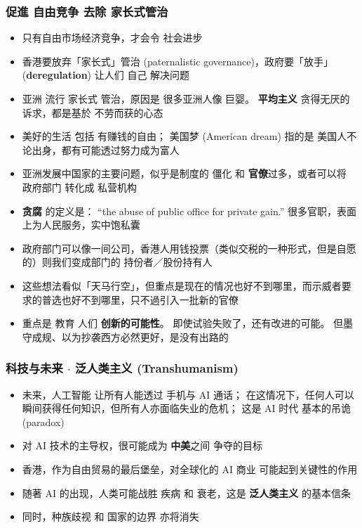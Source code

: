 \documentclass[10pt]{beamer}
\newcommand{\emp}[1]{{\color{blue}\textbf{#1}}}
\newif\ifframeinlbf
\begin{document}
\begin{frame}
\frametitle{促進 自由竞争 \textbullet 去除 家长式管治}
\begin{itemize}
	\item 只有自由市场经济竞争，才会令 社会进步
	
	\item 香港要放弃「家长式」管治 (paternalistic governance)，政府要「放手」(\emp{deregulation}) 让人们 自己 解决问题
	
	\item 亚洲 流行 家长式 管治，原因是 很多亚洲人像 巨婴。 \emp{平均主义} 贪得无厌的诉求，都是基於 不劳而获的心态
	
	\item 美好的生活 包括 有赚钱的自由； 美国梦 (American dream) 指的是 美国人不论出身，都有可能透过努力成为富人
	
	\item 亚洲发展中国家的主要问题，似乎是制度的 僵化 和 \emp{官僚}过多，或者可以将 政府部门 转化成 私营机构
	
	\item \emp{贪腐} 的定义是： ``the abuse of public office for private gain.''  很多官职，表面上为人民服务，实中饱私囊

	\item 政府部门可以像一间公司，香港人用钱投票（类似交税的一种形式，但是自愿的）则我们变成部门的 持份者／股份持有人
	
	\item 这些想法看似「天马行空」，但重点是现在的情况也好不到哪里，而示威者要求的普选也好不到哪里，只不過引入一批新的官僚
	
	\item 重点是 教育 人们 \emp{创新的可能性}。 即使试验失败了，还有改进的可能。 但墨守成规、以为抄袭西方必然更好，是没有出路的

\end{itemize}
\end{frame}


\frameinlbftrue
\begin{frame}
\frametitle{科技与未来 $\cdot$ 泛人类主义 (Transhumanism)}
\begin{itemize}
	\item 未来，人工智能 让所有人能透过 手机与 AI 通话； 在这情况下，任何人可以瞬间获得任何知识，但所有人亦面临失业的危机； 这是 AI 时代 基本的吊诡 (paradox)
	
	\item 对 AI 技术的主导权，很可能成为 \textbf{中美}之间 争夺的目标
	
	\item 香港，作为自由贸易的最后堡垒，对全球化的 AI 商业 可能起到关键性的作用
	
	\item 随著 AI 的出现，人类可能战胜 疾病 和 衰老，这是 \emp{泛人类主义} 的基本信条
	
	\item 同时，种族歧视 和 国家的边界 亦将消失
\end{itemize}
\end{frame}
\end{document}
